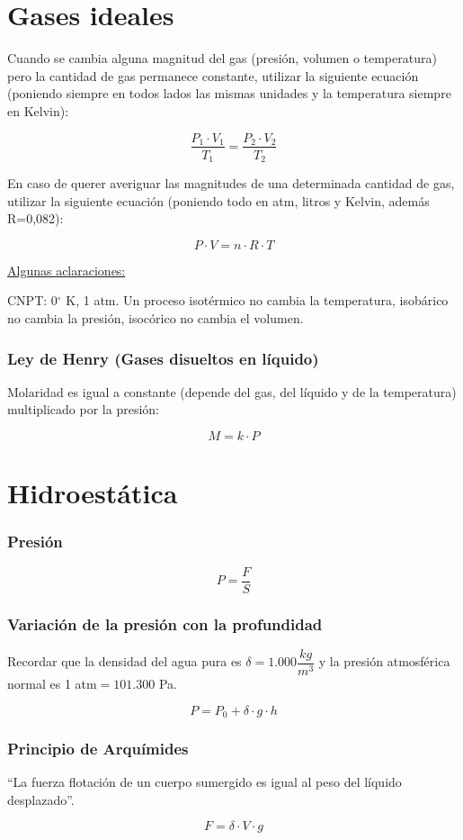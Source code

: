 \section{Gases ideales}

Cuando se cambia alguna magnitud del gas (presión, volumen o temperatura) pero la cantidad de gas permanece constante, utilizar la siguiente ecuación (poniendo siempre en todos lados las mismas unidades y la temperatura siempre en Kelvin):

$$ \dfrac{P_1 \cdot V_1}{T_1} = \dfrac{P_2 \cdot V_2}{T_2}$$

En caso de querer averiguar las magnitudes de una determinada cantidad de gas, utilizar la siguiente ecuación (poniendo todo en atm, litros y Kelvin, además R=0,082):

$$ P \cdot V = n \cdot R \cdot T$$

\underline{Algunas aclaraciones:}

\skipline
CNPT: 0$^\circ$ K, 1 atm. Un proceso isotérmico no cambia la temperatura, isobárico no cambia la presión, isocórico no cambia el volumen.
\subsubsection*{Ley de Henry (Gases disueltos en líquido)}

Molaridad es igual a constante (depende del gas, del líquido y de la temperatura) multiplicado por la presión:

$$M = k \cdot P$$

\section{Hidroestática}

\subsubsection*{Presión}

$$P = \dfrac{F}{S}$$

\subsubsection*{Variación de la presión con la profundidad} 

Recordar que la densidad del agua pura es $\delta=1.000 \dfrac{kg}{m^3}$ y la presión atmosférica normal es 1 atm$=101.300$ Pa.

$$P = P_0 + \delta \cdot g \cdot h$$

\subsubsection*{Principio de Arquímides}

``La fuerza flotación de un cuerpo sumergido es igual al peso del líquido desplazado''.

$$F = \delta \cdot V \cdot g$$
